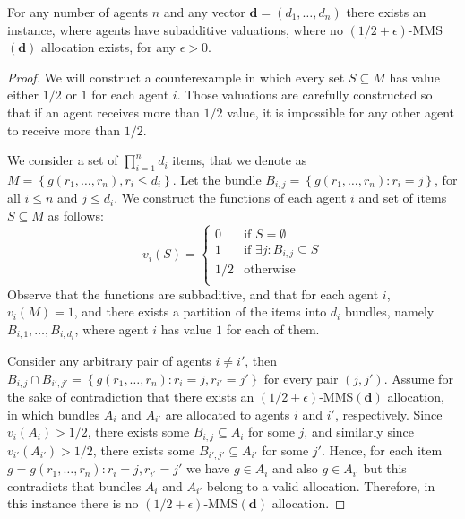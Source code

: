 \begin{lemma}\label{Lemma:upperhalf}
    For any number of agents $n$ and any vector $\boldsymbol{d}=(d_1,\ldots, d_n)$ there exists an instance, where agents have subadditive valuations,  where no $(1/2+\epsilon)$-MMS$(\boldsymbol{d})$ allocation exists, for any $\epsilon>0$. 
\end{lemma}
\begin{proof}
    We will construct a counterexample in which every set $S \subseteq M$ has value either $1/2$ or $1$ for each agent $i$. Those valuations are carefully constructed so that if an agent receives more than $1/2$ value, it is impossible for any other agent to receive more than $1/2$.

    We consider a set of $\prod_{i=1}^n d_i$ items, that we denote as $M = \left\{g(r_1,\ldots,r_n),r_i \le d_i\right\}$.
    Let the bundle $B_{i,j}=\left\{g(r_1,\ldots,r_n):r_i=j\right\}$, for all $i\leq  n$ and $j \le d_i$. We construct the functions of each agent $i$ and set of items $S \subseteq M$ as follows:
    $$v_i\left(S\right) = \begin{cases}
        0 & \text{if } S = \emptyset\\
        1 & \text{if } \exists j: B_{i,j} \subseteq S \\
        1/2 & \text{otherwise}\\
    \end{cases}$$
Observe that the functions are subbaditive, and that for each agent $i$, $v_i(M)=1$, and there exists a partition of the items into $d_i$ bundles, namely $B_{i,1},\ldots,B_{i,d_i}$, where agent $i$ has value $1$ for each of them.

Consider any arbitrary pair of agents $i \ne i'$, then  $B_{i,j} \cap B_{i',j'} = \left\{g(r_1,\ldots,r_n):r_i=j,r_{i'}=j'\right\}$ for every pair $(j,j')$. Assume for the sake of contradiction that there exists an $(1/2+\epsilon)$-MMS$(\boldsymbol{d})$ allocation, in which bundles $A_i$ and $A_{i'}$ are allocated to agents $i$ and $i'$, respectively. Since $v_i\left(A_i\right) > 1/2$, there exists some $B_{i,j} \subseteq A_i$ for some $j$, and similarly since $v_{i'}\left(A_{i'}\right) > 1/2$, there exists some $B_{i',j'} \subseteq A_{i'}$ for some $j'$. Hence, for each item $g = g(r_1,\ldots,r_n):r_i=j,r_{i'}=j'$ we have $g \in A_i$ and also $g \in A_{i'}$ but this contradicts that bundles $A_i$ and $A_{i'}$ belong to a valid allocation. Therefore, in this instance there is no $(1/2+\epsilon)$-MMS$(\boldsymbol{d})$ allocation.
\end{proof}

